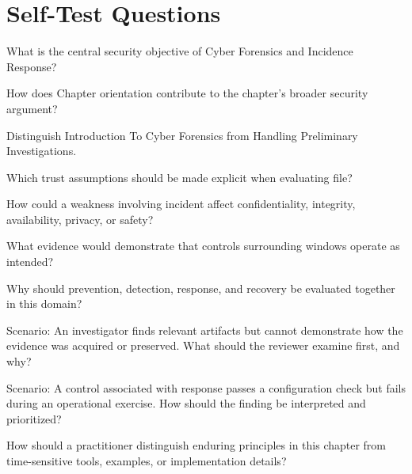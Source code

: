 \documentclass[11pt,letterpaper]{article}
\begin{document}
\section*{Self-Test Questions}
\begin{CornellRecallList}
\item What is the central security objective of Cyber Forensics and Incidence Response?
\item How does Chapter orientation contribute to the chapter's broader security argument?
\item Distinguish Introduction To Cyber Forensics from Handling Preliminary Investigations.
\item Which trust assumptions should be made explicit when evaluating file?
\item How could a weakness involving incident affect confidentiality, integrity, availability, privacy, or safety?
\item What evidence would demonstrate that controls surrounding windows operate as intended?
\item Why should prevention, detection, response, and recovery be evaluated together in this domain?
\item Scenario: An investigator finds relevant artifacts but cannot demonstrate how the evidence was acquired or preserved. What should the reviewer examine first, and why?
\item Scenario: A control associated with response passes a configuration check but fails during an operational exercise. How should the finding be interpreted and prioritized?
\item How should a practitioner distinguish enduring principles in this chapter from time-sensitive tools, examples, or implementation details?
\end{CornellRecallList}
\end{document}
